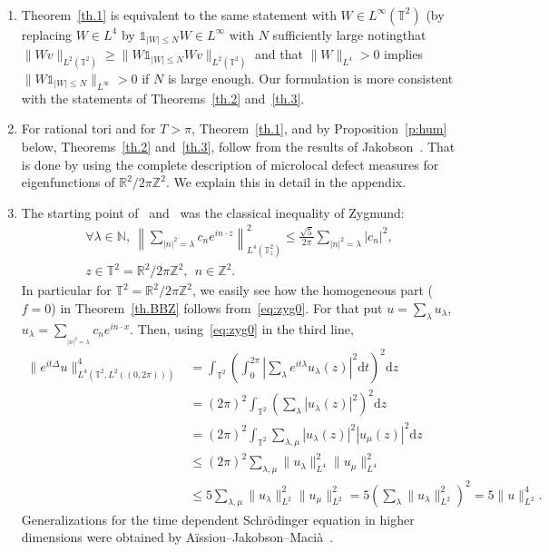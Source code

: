 \documentclass[AHL, Unicode, longabstracts]{cedram}
\newcommand*\bbbone{\mathds{1}}
\newcommand{\R}{{\mathbb R}}
\newcommand{\TT}{{\mathbb T}}
\newcommand{\ZZ}{{\mathbb Z}}
\newcommand{\TT}{{\mathbb T}}
\newcommand{\R}{{\mathbb R}}
\newcommand{\ZZ}{{\mathbb Z}}
\newcommand*\N{\mathbb N}
\newcommand*{\dd}{\mathrm{d}}
\newcommand*{\dz}{\dd z}
\newcommand*{\dt}{\dd t}
\let\oldforall\forall
\renewcommand*{\forall}{\mathrel{\oldforall}}
\newenvironment{remasc*}{\let\pointir\relax \begin{remas*}}{\end{remas*}}
\begin{document}
\begin{remasc*}\ 
\begin{enumerate}
\item \label{rem1} Theorem~\ref{th.1} is equivalent to the same statement with $ W \in L^\infty (\TT^2)$ (by replacing $ W \in L^4 $ by $ \bbbone_{ |W | \leq N } W \in L^\infty $ with $ N$ sufficiently large noting\linebreak that $ \| W v \|_{ L^2 (\TT^2) } \geq \| W \bbbone_{ |W | \leq N } W v \|_{ L^2 (\TT^2) } $ and that $ \|W \|_{L^4} > 0 $ implies \linebreak$\| W \bbbone_{ |W | \leq N } \|_{L^\infty}> 0 $ if $ N $ is large enough. Our formulation is more consistent with the statements of Theorems~\ref{th.2} and~\ref{th.3}.

\item \label{rem2} For rational tori and for $ T > \pi $, Theorem~\ref{th.1}, and by Proposition~\ref{p:hum} below, Theorems~\ref{th.2} and~\ref{th.3}, follow from the results of Jakobson~\cite{Jak}. That is done by using the complete description of microlocal defect measures for eigenfunctions of $
\mathcal \R^2 / 2 \pi \ZZ^2 $. We explain this in detail in the appendix.

\item \label{rem3} The starting point of~\cite{Jak} and~\cite{BBZ} was the classical inequality of Zygmund:
\begin{multline}\label{eq:zyg0}
\forall \lambda \in \N,\ \left\| \sum_{{ |n|^2= \lambda}} c_ne^{in \cdot z} \right\|_{L^4(\TT^2_z)}^2 \leq \frac{\sqrt 5}{ 2 \pi}
\sum_{{ |n|^2= \lambda}} |c_n|^2, \\ z \in \TT^2 = \R^2 / 2 \pi \ZZ^2, \ \ n \in \ZZ^2.
\end{multline}
In particular for $ \TT^2 = \R^2/ 2 \pi \ZZ^2 $, we easily see how the homogeneous part ($f=0$) in Theorem~\ref{th.BBZ} follows from~\eqref{eq:zyg0}. For that put $ u = \sum_{\lambda } u_\lambda$, $ u_\lambda = \sum_{ _{ { |n|^2= \lambda}} } c_n e^{ i n \cdot x} $. Then, using~\eqref{eq:zyg0} in the third line,
\begin{align*}
\| e^{ it \Delta } u \|_{ L^4 (\TT^2, L^2 ((0, 2 \pi))) }^4 & =
\int_{ \TT^2 } \left(\int_{0}^{2\pi } \left| \sum_{ \lambda } e^{ it \lambda} u_\lambda (z) \right|^2 \dt \right)^2 \dz \\
& = (2 \pi)^2 \int_{ \TT^2 } \left(\sum_\lambda | u_\lambda (z) |^2 \right)^2 \dz \\
& = (2 \pi)^2\int_{\TT^2 } \sum_{ \lambda, \mu} |u_\lambda (z) |^2 |u_\mu (z) |^2 \dz \\
&\leq (2 \pi)^2\sum_{ \lambda, \mu } \| u_\lambda \|_{L^4}^2 \| u_\mu \|_{L^4}^2\\
& \leq 5 \sum_{ \lambda, \mu} \| u_\lambda \|_{L^2}^2 \| u_\mu \|_{L^2}^2 = 5 \left(\sum_\lambda \| u_\lambda \|_{L^2}^2 \right)^2 = 5 \| u \|_{L^2}^4.
\end{align*}
Generalizations for the time dependent Schrödinger equation in higher dimensions were obtained by Aïssiou--Jakobson--Macià~\cite{AJM}.


\end{enumerate}
\end{remasc*}
\end{document}

